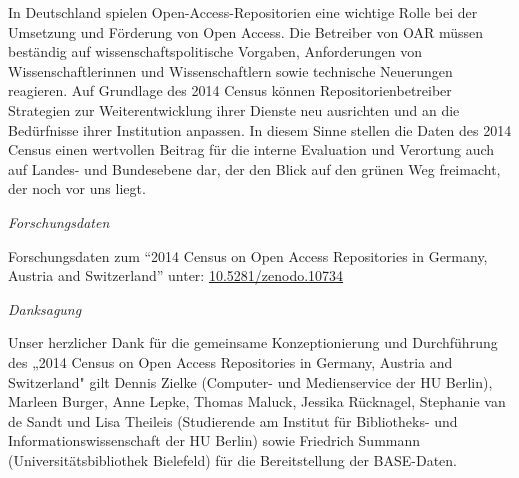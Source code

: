 \documentclass[a4paper,
fontsize=11pt,
oneside,
numbers=noperiodatend,
parskip=half-,
bibliography=totoc,
final
]{scrartcl}
\begin{document}
In Deutschland spielen Open-Access-Repositorien eine wichtige Rolle bei
der Umsetzung und Förderung von Open Access. Die Betreiber von OAR
müssen beständig auf wissenschaftspolitische Vorgaben, Anforderungen von
Wissenschaftlerinnen und Wissenschaftlern sowie technische Neuerungen
reagieren. Auf Grundlage des 2014 Census können Repositorienbetreiber
Strategien zur Weiterentwicklung ihrer Dienste neu ausrichten und an die
Bedürfnisse ihrer Institution anpassen. In diesem Sinne stellen die
Daten des 2014 Census einen wertvollen Beitrag für die interne
Evaluation und Verortung auch auf Landes- und Bundesebene dar, der den
Blick auf den grünen Weg freimacht, der noch vor uns liegt.

\emph{Forschungsdaten}

Forschungsdaten zum ``2014 Census on Open Access Repositories in
Germany, Austria and Switzerland'' unter:
\href{http://doi.org/10.5281/zenodo.10734}{10.5281/zenodo.10734}

\emph{Danksagung}

Unser herzlicher Dank für die gemeinsame Konzeptionierung und
Durchführung des „2014 Census on Open Access Repositories in Germany,
Austria and Switzerland" gilt Dennis Zielke (Computer- und Medienservice
der HU Berlin), Marleen Burger, Anne Lepke, Thomas Maluck, Jessika
Rücknagel, Stephanie van de Sandt und Lisa Theileis (Studierende am
Institut für Bibliotheks- und Informationswissenschaft der HU Berlin)
sowie Friedrich Summann (Universitätsbibliothek Bielefeld) für die
Bereitstellung der BASE-Daten.

\end{document}
